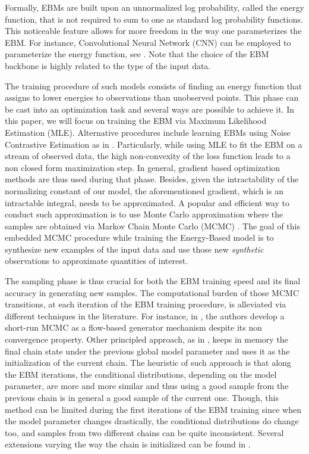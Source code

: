 \documentclass[letterpaper]{article} %
\begin{document}
Formally, EBMs are built upon an unnormalized log probability, called the energy function, that is not required to sum to one as standard log probability functions.
This noticeable feature allows for more freedom in the way one parameterizes the EBM.
For instance, Convolutional Neural Network (CNN) can be employed to parameterize the energy function, see \cite{xie2016theory}.
Note that the choice of the EBM backbone is highly related to the type of the input data.

The training procedure of such models consists of finding an energy function that assigns to lower energies to observations than unobserved points.
This phase can be cast into an optimization task and several ways are possible to achieve it.
In this paper, we will focus on training the EBM via Maximum Likelihood Estimation (MLE).
Alternative procedures include learning EBMs using Noise Contrastive Estimation as in \cite{gao2020flow}.
Particularly, while using MLE to fit the EBM on a stream of observed data, the high non-convexity of the loss function leads to a non closed form maximization step. 
In general, gradient based optimization methods are thus used during that phase.
Besides, given the intractability of the normalizing constant of our model, the aforementioned gradient, which is an intractable integral, needs to be approximated.
A popular and efficient way to conduct such approximation is to use Monte Carlo approximation where the samples are obtained via Markov Chain Monte Carlo (MCMC) \cite{meyn2012markov}.
The goal of this embedded MCMC procedure while training the Energy-Based model is to synthesize new examples of the input data and use those new \emph{synthetic} observations to approximate quantities of interest.

The sampling phase is thus crucial for both the EBM training speed and its final accuracy in generating new samples.
The computational burden of those MCMC transitions, at each iteration of the EBM training procedure, is alleviated via different techniques in the literature.
For instance, in \cite{nijkamp2019learning}, the authors develop a short-run MCMC as a flow-based generator mechanism despite its non convergence property.
Other principled approach, as in \cite{hinton2002training}, keeps in memory the final chain state under the previous global model parameter and uses it as the initialization of the current chain.
The heuristic of such approach is that along the EBM iterations, the conditional distributions, depending on the model parameter, are more and more similar and thus using a good sample from the previous chain is in general a good sample of the current one.
Though, this method can be limited during the first iterations of the EBM training since when the model parameter changes drastically, the conditional distributions do change too, and samples from two different chains can be quite inconsistent.
Several extensions varying the way the chain is initialized can be found in \cite{welling2002new,gao2018learning,du2019implicit}.
\end{document}
